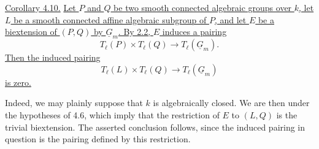 \medskip
\noindent\underline{Corollary 4.10.}  \underline{Let $P$ and $Q$ be
two smooth connected algebraic groups over $k$, let $L$ be a smooth
connected affine algebraic subgroup of $P$, and let $E$ be a
biextension of $(P,Q)$ by $\underline G_m$.  By 2.2, $E$ induces a
pairing}
\[
 T_\ell(P)\times T_\ell(Q)\longrightarrow T_\ell(\underline G_m).
\]
\underline{Then the induced pairing}
\[
 T_\ell(L)\times T_\ell(Q)\longrightarrow T_\ell(\underline G_m)
\]
\underline{is zero.}

Indeed, we may plainly suppose that $k$ is algebraically closed.  We
are then under the hypotheses of 4.6, which imply that the
restriction of $E$ to $(L,Q)$ is the trivial biextension.  The
asserted conclusion follows, since the induced pairing in question
is the pairing defined by this restriction.
